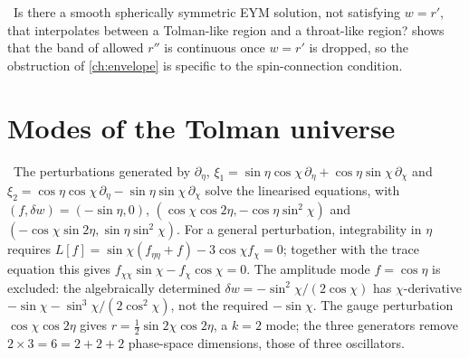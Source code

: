 \begin{remark}\opn\
Is there a smooth spherically symmetric EYM solution, not satisfying $w=r'$, that interpolates between a Tolman-like region and a throat-like region?  shows that the band of allowed $r''$ is continuous once $w=r'$ is dropped, so the obstruction of \cref{ch:envelope} is specific to the spin-connection condition.
\end{remark}

\section{Modes of the Tolman universe}

\begin{proposition}[Gauge modes]\label{prop:gaugemodes}\ver\
The perturbations generated by $\partial_\eta$, $\xi_1=\sin\eta\cos\chi\,\partial_\eta+\cos\eta\sin\chi\,\partial_\chi$ and $\xi_2=\cos\eta\cos\chi\,\partial_\eta-\sin\eta\sin\chi\,\partial_\chi$ solve the linearised equations, with $(f,\delta w)=(-\sin\eta,0)$, $(\cos\chi\cos2\eta,-\cos\eta\sin^2\chi)$ and $(-\cos\chi\sin2\eta,\sin\eta\sin^2\chi)$. For a general perturbation, integrability in $\eta$ requires $L[f]=\sin\chi(f_{\eta\eta}+f)-3\cos\chi f_\chi=0$; together with the trace equation this gives $f_{\chi\chi}\sin\chi-f_\chi\cos\chi=0$. The amplitude mode $f=\cos\eta$ is excluded: the algebraically determined $\delta w=-\sin^2\chi/(2\cos\chi)$ has $\chi$-derivative $-\sin\chi-\sin^3\chi/(2\cos^2\chi)$, not the required $-\sin\chi$. The gauge perturbation $\cos\chi\cos2\eta$ gives $r=\frac12\sin2\chi\cos2\eta$, a $k=2$ mode; the three generators remove $2\times3=6=2+2+2$ phase-space dimensions, those of three oscillators.
\end{proposition}
